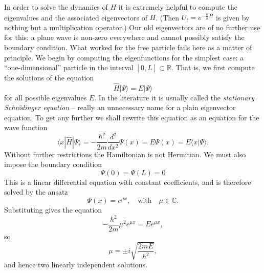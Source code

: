 In order to solve the dynamics of $H$ it is extremely helpful to compute the eigenvalues and the associated eigenvectors of $H$. (Then $U_t=e^{-\frac{it}{\hbar}\widehat{H}}$ is given by nothing but a multiplication operator.) Our old eigenvectors are of no further use for this: a plane wave is non-zero everywhere and cannot possibly satisfy the boundary condition. What worked for the free particle fails here as a matter of principle. We begin by computing the eigenfunctions for the simplest case: a ``one-dimensional'' particle in the interval $[0,L] \subset \mathbb{R}$. That is, we first compute the solutions of the equation
\begin{equation}
	\widehat{H}|\Psi\rangle = E|\Psi\rangle
\end{equation}
for all possible eigenvalues $E$. In the literature it is usually called the \emph{stationary Schrödinger equation} -- really an unnecessary name for a plain eigenvector equation. To get any further we shall rewrite this equation as an equation for the wave function
\begin{equation}
	\langle x|\widehat{H}|\Psi\rangle = -\frac{\hbar^2}{2m}\frac{d^2}{dx^2}\Psi(x) = E\Psi(x) = E\langle x|\Psi\rangle.
\end{equation}
Without further restrictions the Hamiltonian is not Hermitian. We must also impose the boundary condition 
\begin{equation}
	\Psi(0) = \Psi(L) = 0
\end{equation} 
This is a linear differential equation with constant coefficients, and is therefore
solved by the ansatz
\begin{equation}
	\Psi(x) = e^{\mu x}, \quad\text{with}\quad \mu\in \mathbb{C}.
\end{equation}
Substituting gives the equation
\begin{equation}
	-\frac{\hbar^2}{2m} \mu^2 e^{\mu x} = E e^{\mu x},
\end{equation}
so
\begin{equation}
	\mu = \pm i \sqrt{\frac{2mE}{\hbar^2}}, 
\end{equation}
and hence two linearly independent solutions.

